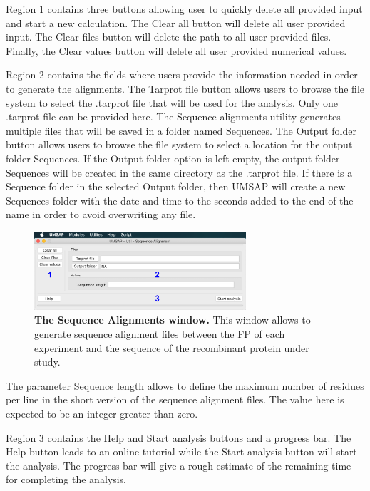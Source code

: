 Region \num{1} contains three buttons allowing user to quickly delete all provided input and start a new calculation. The Clear all button will delete all user provided input. The Clear files button will delete the path to all user provided files. Finally, the Clear values button will delete all user provided numerical values.

Region \num{2} contains the fields where users provide the information needed in order to generate the alignments. The Tarprot file button allows users to browse the file system to select the .tarprot file that will be used for the analysis. Only one .tarprot file can be provided here. The Sequence alignments utility generates multiple files that will be saved in a folder named Sequences. The Output folder button allows users to browse the file system to select a location for the output folder Sequences. If the Output folder option is left empty, the output folder Sequences will be created in the same directory as the .tarprot file. If there is a Sequence folder in the selected Output folder, then UMSAP will create a new Sequences folder with the date and time to the seconds added to the end of the name in order to avoid overwriting any file. 

\begin{figure}[h]
	\centering
	\includegraphics[width=0.7\textwidth]{./IMAGES/UTIL-SEQ-WINDOW/util-seq.jpg}	    
	\caption[The Sequence Alignments window]{\textbf{The Sequence Alignments window.} This window allows to generate sequence alignment files between the FP of each experiment and the sequence of the recombinant protein under study.} 
	\label{fig:seqaliset}
	\vspace{-5pt} 	
\end{figure} 

The parameter Sequence length allows to define the maximum number of residues per line in the short version of the sequence alignment files. The value here is expected to be an integer greater than zero.

Region \num{3} contains the Help and Start analysis buttons and a progress bar. The Help button leads to an online tutorial while the Start analysis button will start the analysis. The progress bar will give a rough estimate of the remaining time for completing the analysis.

